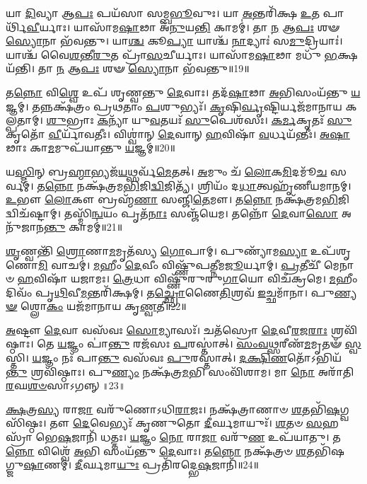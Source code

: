 𑌯𑌾 \ul{𑌦𑌿}\-𑌵𑍍𑌯𑌾 𑌆\-\ul{𑌪𑌃} 𑌪𑌯᳴𑌸𑌾 𑌸𑌮𑍍𑌬\-\ul{𑌭𑍂}\-𑌵𑍁𑌃। 
𑌯𑌾 \ul{𑌅}\-𑌨𑍍𑌤𑌰𑌿᳴𑌕𑍍𑌷 \ul{𑌉}\-𑌤 𑌪𑌾𑌰𑍍𑌥𑌿᳴\-\ul{𑌵𑍀}\-𑌰𑍍𑌯𑌾𑌃। 
𑌯𑌾𑌸𑌾᳴𑌮\-\ul{𑌷𑌾}\-𑌢𑌾 𑌅᳴\-\ul{𑌨𑍁}\-𑌯\-\ul{𑌨𑍍𑌤𑌿} 𑌕𑌾𑌮𑌮𑍍॑। 
𑌤𑌾 \ul{𑌨} 𑌆\-\ul{𑌪𑌃} 𑌶𑍟 \ul{𑌸𑍍𑌯𑍋}\-𑌨𑌾 𑌭᳴𑌵𑌨𑍍𑌤𑍁। 
𑌯𑌾\-\ul{𑌶𑍍𑌚} 𑌕𑍂\-\ul{𑌪𑍍𑌯𑌾} 𑌯𑌾𑌶𑍍𑌚᳴ \ul{𑌨𑌾}\-𑌦𑍍𑌯𑌾𑌃॑ 𑌸\-\ul{𑌮𑍁}\-𑌦𑍍𑌰𑌿𑌯𑌾𑌃॑। 
𑌯𑌾𑌶𑍍𑌚᳴ 𑌵𑍈\-\ul{𑌶}\-𑌨𑍍𑌤𑍀\-\ul{𑌰𑍁}\-𑌤 𑌪𑍍𑌰𑌾᳴\-\ul{𑌸}\-𑌚𑍀𑌰𑍍𑌯𑌾𑌃। 
𑌯𑌾𑌸𑌾᳴𑌮\-\ul{𑌷𑌾}\-𑌢𑌾 𑌮𑌧𑍁᳴ \ul{𑌭}\-𑌕𑍍𑌷𑌯᳴𑌨𑍍𑌤𑌿। 
𑌤𑌾 \ul{𑌨} 𑌆\-\ul{𑌪𑌃} 𑌶𑍟 \ul{𑌸𑍍𑌯𑍋}\-𑌨𑌾 𑌭᳴𑌵𑌨𑍍𑌤𑍁॥19॥ 

𑌤\-\ul{𑌨𑍍𑌨𑍋} 𑌵𑌿\-\ul{𑌶𑍍𑌵𑍇} 𑌉𑌪᳴ 𑌶𑍃𑌣𑍍𑌵𑌨𑍍𑌤𑍁 \ul{𑌦𑍇}\-𑌵𑌾𑌃। 
𑌤𑌦᳴\-\ul{𑌷𑌾}\-𑌢𑌾 \ul{𑌅}\-𑌭𑌿𑌸𑌂𑌯᳴𑌨𑍍𑌤𑍁 \ul{𑌯}\-𑌜𑍍𑌞𑌮𑍍। 
𑌤𑌨𑍍𑌨𑌕𑍍𑌷᳴𑌤𑍍𑌰𑌂 𑌪𑍍𑌰𑌥𑌤𑌾𑌂 \ul{𑌪}\-𑌶𑍁𑌭𑍍𑌯𑌃᳴। 
\-\ul{𑌕𑍃}\-𑌷𑌿\-\ul{𑌰𑍍𑌵𑍃}\-𑌷𑍍𑌟𑌿𑌰𑍍𑌯𑌜᳴𑌮𑌾𑌨𑌾𑌯 𑌕𑌲𑍍𑌪𑌤𑌾𑌮𑍍। 
\-\ul{𑌶𑍁}\-𑌭𑍍𑌰𑌾𑌃 \ul{𑌕}\-𑌨𑍍𑌯𑌾᳴ 𑌯𑍁\-\ul{𑌵}\-𑌤𑌯𑌃᳴ \ul{𑌸𑍁}\-𑌪𑍇𑌶᳴𑌸𑌃। 
\-\ul{𑌕}\-\-\ul{𑌰𑍍𑌮}\-𑌕𑍃𑌤𑌃᳴ \ul{𑌸𑍁}\-𑌕𑍃𑌤𑍋᳴ \ul{𑌵𑍀}\-𑌰𑍍𑌯𑌾᳴𑌵𑌤𑍀𑌃। 
𑌵𑌿𑌶𑍍𑌵𑌾॑𑌨𑍍 \ul{𑌦𑍇}\-𑌵𑌾𑌨𑍍 \ul{𑌹}\-𑌵𑌿𑌷𑌾᳴ \ul{𑌵}\-𑌰𑍍𑌧𑌯᳴𑌨𑍍𑌤𑍀𑌃। 
\-\ul{𑌅}\-\-\ul{𑌷𑌾}\-𑌢𑌾𑌃 𑌕𑌾\-\ul{𑌮}\-𑌮𑍁𑌪᳴𑌯𑌾𑌨𑍍𑌤𑍁 \ul{𑌯}\-𑌜𑍍𑌞𑌮𑍍॥20॥ 

𑌯\-\ul{𑌸𑍍𑌮𑌿}\-𑌨𑍍 𑌬𑍍𑌰\-\ul{𑌹𑍍𑌮𑌾}\-𑌭𑍍𑌯𑌜᳴\-\ul{𑌯}\-𑌥𑍍𑌸𑌰𑍍𑌵᳴\-\ul{𑌮𑍇}\-𑌤𑌤𑍍। 
\-\ul{𑌅}\-𑌮𑍁𑌂 𑌚᳴ \ul{𑌲𑍋}\-𑌕\-\ul{𑌮𑌿}\-𑌦𑌮𑍂᳴\-\ul{𑌚} 𑌸𑌰𑍍𑌵𑌮𑍍॑। 
𑌤\-\ul{𑌨𑍍𑌨𑍋} 𑌨𑌕𑍍𑌷᳴𑌤𑍍𑌰𑌮\-\ul{𑌭𑌿}\-𑌜𑌿\-\ul{𑌦𑍍𑌵𑌿}\-𑌜𑌿𑌤𑍍𑌯᳴। 
𑌶𑍍𑌰𑌿𑌯𑌂᳴ 𑌦\-\ul{𑌧𑌾}\-𑌤𑍍𑌵𑌹𑍃᳴𑌣𑍀𑌯\-𑌮𑌾𑌨𑌮𑍍। 
\-\ul{𑌉}\-𑌭𑍗 \ul{𑌲𑍋}\-𑌕𑍗 𑌬𑍍𑌰𑌹𑍍𑌮᳴\-\ul{𑌣𑌾} 𑌸𑌞𑍍𑌜𑌿᳴\-\ul{𑌤𑍇}\-𑌮𑍗। 
𑌤\-\ul{𑌨𑍍𑌨𑍋} 𑌨𑌕𑍍𑌷᳴𑌤𑍍𑌰𑌮\-\ul{𑌭𑌿}\-𑌜𑌿𑌦𑍍𑌵𑌿𑌚᳴𑌷𑍍𑌟𑌾𑌮𑍍। 
𑌤𑌸𑍍𑌮𑌿᳴\-\ul{𑌨𑍍𑌵}\-𑌯𑌂 𑌪𑍃𑌤᳴\-\ul{𑌨𑌾𑌃} 𑌸𑌞𑍍𑌜᳴𑌯𑍇𑌮। 
𑌤𑌨𑍍𑌨𑍋᳴ \ul{𑌦𑍇}\-𑌵𑌾\-\ul{𑌸𑍋} 𑌅𑌨𑍁᳴𑌜𑌾𑌨\-\ul{𑌨𑍍𑌤𑍁} 𑌕𑌾𑌮𑌮𑍍॑॥21॥ 

\-\ul{𑌶𑍃}\-𑌣𑍍𑌵𑌨𑍍𑌤𑌿᳴ \ul{𑌶𑍍𑌰𑍋}\-𑌣𑌾\-\ul{𑌮}\-𑌮𑍃𑌤᳴𑌸𑍍𑌯 \ul{𑌗𑍋}\-𑌪𑌾𑌮𑍍। 
𑌪𑍁𑌣𑍍𑌯𑌾᳴𑌮\-\ul{𑌸𑍍𑌯𑌾} 𑌉𑌪᳴𑌶𑍃𑌣𑍋\-\ul{𑌮𑌿} 𑌵𑌾𑌚𑌮𑍍॑। 
\-\ul{𑌮}\-𑌹𑍀𑌂 \ul{𑌦𑍇}\-𑌵𑍀𑌂 𑌵𑌿𑌷𑍍𑌣𑍁᳴𑌪𑌤𑍍𑌨𑍀𑌮\-\ul{𑌜𑍂}\-𑌰𑍍𑌯𑌾𑌮𑍍। 
\-\ul{𑌪𑍍𑌰}\-𑌤𑍀𑌚𑍀᳴ 𑌮𑍇𑌨𑌾𑍞 \ul{𑌹}\-𑌵𑌿𑌷𑌾᳴ 𑌯𑌜𑌾𑌮𑌃। 
\-\ul{𑌤𑍍𑌰𑍇}\-𑌧𑌾 𑌵𑌿𑌷𑍍𑌣𑍁᳴𑌰𑍁𑌰𑍁\-\ul{𑌗𑌾}\-𑌯𑍋 𑌵𑌿𑌚᳴𑌕𑍍𑌰𑌮𑍇। 
\-\ul{𑌮}\-𑌹𑍀𑌂 𑌦𑌿𑌵𑌂᳴ 𑌪𑍃\-\ul{𑌥𑌿}\-𑌵𑍀\-\ul{𑌮}\-𑌨𑍍𑌤𑌰𑌿᳴𑌕𑍍𑌷𑌮𑍍। 
𑌤\-\ul{𑌚𑍍𑌛𑍍𑌰𑍋}\-𑌣𑍈\-\ul{𑌤𑌿}\-𑌶𑍍𑌰𑌵᳴ \ul{𑌇}\-𑌚𑍍𑌛𑌮𑌾᳴𑌨𑌾। 
𑌪𑍁\-\ul{𑌣𑍍𑌯}\-\-\ul{𑍟} 𑌶𑍍𑌲𑍋\-\ul{𑌕𑌂} 𑌯𑌜᳴𑌮𑌾𑌨𑌾𑌯 𑌕𑍃\-\ul{𑌣𑍍𑌵}\-𑌤𑍀॥22॥ 

\-\ul{𑌅}\-𑌷𑍍𑌟𑍗 \ul{𑌦𑍇}\-𑌵𑌾 𑌵𑌸᳴𑌵𑌃 \ul{𑌸𑍋}\-𑌮𑍍𑌯𑌾𑌸𑌃᳴। 
𑌚𑌤᳴𑌸𑍍𑌰𑍋 \ul{𑌦𑍇}\-𑌵𑍀\-\ul{𑌰}\-𑌜\-\ul{𑌰𑌾𑌃} 𑌶𑍍𑌰𑌵𑌿᳴𑌷𑍍𑌠𑌾𑌃। 
𑌤𑍇 \ul{𑌯}\-𑌜𑍍𑌞𑌂 𑌪𑌾॑\-\ul{𑌨𑍍𑌤𑍁} 𑌰𑌜᳴𑌸𑌃 \ul{𑌪}\-𑌰𑌸𑍍𑌤𑌾॑𑌤𑍍। 
\-\ul{𑌸𑌂}\-\-\ul{𑌵}\-\-\ul{𑌥𑍍𑌸}\-𑌰𑍀𑌣᳴\-\ul{𑌮}\-𑌮𑍃𑌤𑍟᳴ \ul{𑌸𑍍𑌵}\-𑌸𑍍𑌤𑌿। 
\-\ul{𑌯}\-𑌜𑍍𑌞𑌂 𑌨𑌃᳴ 𑌪𑌾\-\ul{𑌨𑍍𑌤𑍁} 𑌵𑌸᳴𑌵𑌃 \ul{𑌪𑍁}\-𑌰𑌸𑍍𑌤𑌾॑𑌤𑍍। 
\-\ul{𑌦}\-\-\ul{𑌕𑍍𑌷𑌿}\-\-\ul{𑌣}\-𑌤𑍋᳴𑌽𑌭𑌿𑌯᳴\-\ul{𑌨𑍍𑌤𑍁} 𑌶𑍍𑌰𑌵𑌿᳴𑌷𑍍𑌠𑌾𑌃। 
𑌪𑍁\-\ul{𑌣𑍍𑌯𑌂} 𑌨𑌕𑍍𑌷᳴𑌤𑍍𑌰\-\ul{𑌮}\-𑌭𑌿 𑌸𑌂𑌵𑌿᳴𑌶𑌾𑌮। 
𑌮𑌾 \ul{𑌨𑍋} 𑌅𑌰𑌾᳴𑌤𑌿\-\ul{𑌰}\-𑌘\-\ul{𑌶}\-\-\ul{𑍞}\-𑌸𑌾𑌽𑌗𑌨𑍍𑌨𑍍॥23॥ 

\-\ul{𑌕𑍍𑌷}\-𑌤𑍍𑌰\-\ul{𑌸𑍍𑌯} 𑌰𑌾\-\ul{𑌜𑌾} 𑌵𑌰𑍁᳴𑌣𑍋𑌽𑌧𑌿\-\ul{𑌰𑌾}\-𑌜𑌃। 
𑌨𑌕𑍍𑌷᳴𑌤𑍍𑌰𑌾𑌣𑌾𑍞 \ul{𑌶}\-𑌤𑌭𑌿᳴\-\ul{𑌷}\-𑌗𑍍𑌵𑌸𑌿᳴𑌷𑍍𑌠𑌃। 
𑌤𑍗 \ul{𑌦𑍇}\-𑌵𑍇𑌭𑍍𑌯𑌃᳴ 𑌕𑍃𑌣𑍁𑌤𑍋 \ul{𑌦𑍀}\-𑌰𑍍𑌘𑌮𑌾𑌯𑍁𑌃᳴। 
\-\ul{𑌶}\-𑌤𑍞 \ul{𑌸}\-𑌹𑌸𑍍𑌰𑌾᳴ 𑌭𑍇\-\ul{𑌷}\-𑌜𑌾𑌨𑌿᳴ 𑌧𑌤𑍍𑌤𑌃। 
\-\ul{𑌯}\-𑌜𑍍𑌞𑌂 \ul{𑌨𑍋} 𑌰𑌾\-\ul{𑌜𑌾} 𑌵𑌰𑍁᳴\-\ul{𑌣} 𑌉𑌪᳴𑌯𑌾𑌤𑍁। 
𑌤\-\ul{𑌨𑍍𑌨𑍋} 𑌵𑌿𑌶𑍍𑌵𑍇᳴ \ul{𑌅}\-𑌭𑌿 𑌸𑌂𑌯᳴𑌨𑍍𑌤𑍁 \ul{𑌦𑍇}\-𑌵𑌾𑌃। 
𑌤\-\ul{𑌨𑍍𑌨𑍋} 𑌨𑌕𑍍𑌷᳴𑌤𑍍𑌰𑍞 \ul{𑌶}\-𑌤𑌭𑌿᳴𑌷𑌗𑍍𑌜𑍁\-\ul{𑌷𑌾}\-𑌣𑌮𑍍। 
\-\ul{𑌦𑍀}\-𑌰𑍍𑌘𑌮𑌾\-\ul{𑌯𑍁𑌃} 𑌪𑍍𑌰𑌤𑌿᳴𑌰𑌦𑍍𑌭𑍇\-\ul{𑌷}\-𑌜𑌾𑌨𑌿᳴॥24॥ 

